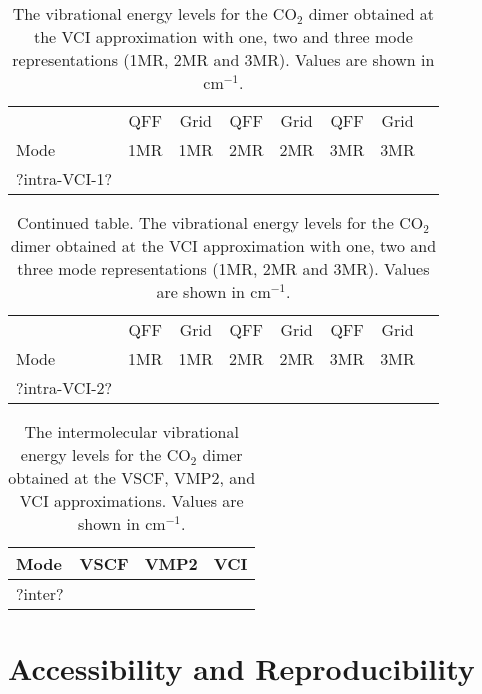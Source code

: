 \documentclass[aip,jcp,showpacs,superscriptaddress,groupedaddress]{revtex4-1}  %
\begin{document}
\begin{table}[H]
\caption{The vibrational energy levels for the CO$_2$ dimer obtained at the VCI approximation with one, two and three mode representations (1MR, 2MR and 3MR). Values are shown in cm$^{-1}$.}
\begin{ruledtabular}
\begin{tabular}{lccccccc}
    & QFF &  Grid & QFF & Grid & QFF & Grid   \\  
  Mode & 1MR & 1MR & 2MR & 2MR & 3MR & 3MR   \\ 
\hline \Tstrut
?intra-VCI-1?
\end{tabular}
\end{ruledtabular}
\label{table:intra-vci-1}
\end{table}


\begin{table}[b]
\caption{Continued table. The vibrational energy levels for the CO$_2$ dimer obtained at the VCI approximation with one, two and three mode representations (1MR, 2MR and 3MR). Values are shown in cm$^{-1}$.}
\begin{ruledtabular}
\begin{tabular}{lccccccc}
    & QFF &  Grid & QFF & Grid & QFF & Grid   \\  
  Mode & 1MR & 1MR & 2MR & 2MR & 3MR & 3MR   \\ 
\hline \Tstrut
?intra-VCI-2?
\end{tabular}
\end{ruledtabular}
\label{table:intra-vci-2}
\end{table}


\begin{table}[H]
\caption{The intermolecular vibrational energy levels for the CO$_2$ dimer obtained at the VSCF, VMP2, and VCI approximations. Values are shown in cm$^{-1}$.}
\begin{ruledtabular}
\begin{tabular}{lccc}
  Mode & VSCF & VMP2 & VCI    \\ 
\hline \Tstrut
?inter?
\end{tabular}
\end{ruledtabular}
\label{table:inter}
\end{table}

\section[S3]{\label{sec:reproduce}Accessibility and Reproducibility}
\end{document}
